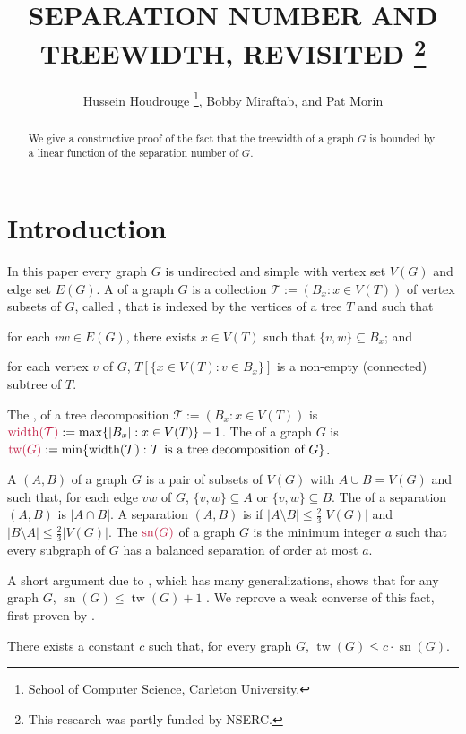 \documentclass{patmorin}
\title{\MakeUppercase{Separation Number and Treewidth, Revisited}%
  \thanks{This research was partly funded by NSERC.}}
\author{Hussein Houdrouge%
  \thanks{School of Computer Science, Carleton University.},\quad
  Bobby Miraftab\footnotemark[2],\quad
  and Pat Morin\footnotemark[2]}
\date{}
\DeclareMathOperator{\sep}{sn}
\DeclareMathOperator{\tw}{tw}
\DeclareMathOperator{\width}{width}
\begin{document}
\maketitle

\begin{abstract}
  We give a constructive proof of the fact that the treewidth of a graph $G$ is bounded by a linear function of the separation number of $G$.
\end{abstract}


\section{Introduction}

In this paper every graph $G$ is undirected and simple with vertex set $V(G)$ and edge set $E(G)$.  A  of a graph $G$ is a collection $\mathcal{T}:=(B_x:x\in V(T))$ of vertex subsets of $G$, called , that is indexed by the vertices of a tree $T$ and such that
\begin{enumerate*}[label=(\roman*)]
  \item\label{covers_edges} for each $vw\in E(G)$, there exists $x\in V(T)$ such that $\{v,w\}\subseteq B_x$; and
  \item\label{connectivity} for each vertex $v$ of $G$, $T[\{x\in V(T): v\in B_x\}]$ is a non-empty (connected) subtree of $T$.
\end{enumerate*}
The , of a tree decomposition $\mathcal{T}:=(B_x:x\in V(T))$ is $\mathdefin{\width(\mathcal{T})}:=\max\{|B_x|:x\in V(T)\}-1$. The  of a graph $G$ is $\mathdefin{\tw(G)}:=\min\{\width(\mathcal{T}):\text{$\mathcal{T}$ is a tree decomposition of $G$}\}$.

A  $(A,B)$ of a graph $G$ is a pair of subsets of $V(G)$ with $A\cup B= V(G)$ and such that, for each edge $vw$ of $G$, $\{v,w\}\subseteq A$ or $\{v,w\}\subseteq B$.  The  of a separation $(A,B)$ is $|A\cap B|$.  A separation $(A,B)$ is  if $|A\setminus B|\le \tfrac{2}{3}|V(G)|$ and $|B\setminus A|\le \tfrac{2}{3}|V(G)|$.  The  $\mathdefin{\sep(G)}$ of a graph $G$ is the minimum integer $a$ such that every subgraph of $G$ has a balanced separation of order at most $a$.

A short argument due to \citet{robertson.seymour:graph}, which has many generalizations, shows that for any graph $G$, $\sep(G)\le \tw(G)+1$ .  We reprove a weak converse of this fact, first proven by \citet{dvorak.norin:treewidth}.
\begin{thm}\label{main_result}
  There exists a constant $c$ such that, for every graph $G$, $\tw(G)\le c\cdot \sep(G)$.
\end{thm}
\end{document}
